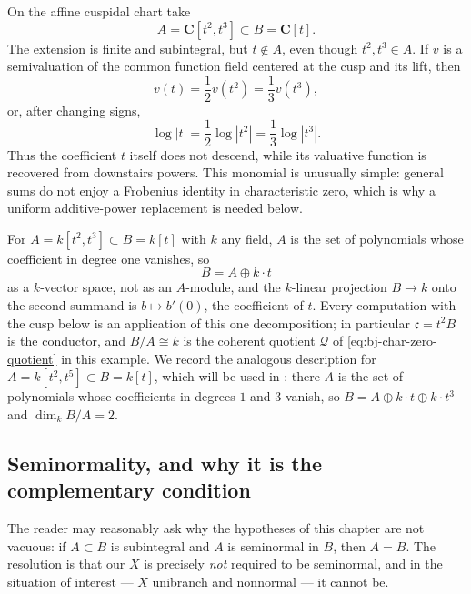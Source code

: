 \begin{example}
\label{ex:ch44-cusp-basic}
On the affine cuspidal chart take
\[
              A=\mathbf C[t^2,t^3]\subset B=\mathbf C[t].
\]
The extension is finite and subintegral, but $t\notin A$, even though
$t^2,t^3\in A$.  If $v$ is a semivaluation of the common function field
centered at the cusp and its lift, then
\[
       v(t)=\frac12v(t^2)=\frac13v(t^3),
\]
or, after changing signs,
\[
       \log|t|=\frac12\log|t^2|
              =\frac13\log|t^3|.
\]
Thus the coefficient $t$ itself does not descend, while its valuative
function is recovered from downstairs powers.  This monomial is unusually
simple: general sums do not enjoy a Frobenius identity in characteristic
zero, which is why a uniform additive-power replacement is needed below.
\end{example}

\begin{remark}
\label{rem:ch44-cusp-decomposition}
For $A=k[t^2,t^3]\subset B=k[t]$ with $k$ any field, $A$ is the set of
polynomials whose coefficient in degree one vanishes, so
\[
 B=A\oplus k\cdot t
\]
as a $k$-vector space, not as an $A$-module, and the $k$-linear
projection $B\to k$ onto the second summand is
$b\mapsto b'(0)$, the coefficient of $t$.  Every computation with the
cusp below is an application of this one decomposition; in particular
$\mathfrak c=t^2B$ is the conductor, and $B/A\cong k$ is the coherent
quotient $\mathcal Q$ of
\eqref{eq:bj-char-zero-quotient} in this example.  We record the analogous
description for $A=k[t^2,t^5]\subset B=k[t]$, which will be used in
: there $A$ is the set of polynomials whose
coefficients in degrees $1$ and $3$ vanish, so
$B=A\oplus k\cdot t\oplus k\cdot t^3$ and $\dim_kB/A=2$.
\end{remark}

\subsection{Seminormality, and why it is the complementary condition}
\label{sec:ch44-seminormality}

The reader may reasonably ask why the hypotheses of this chapter are not
vacuous: if $A\subset B$ is subintegral and $A$ is seminormal in $B$,
then $A=B$.  The resolution is that our $X$ is precisely \emph{not}
required to be seminormal, and in the situation of interest --- $X$
unibranch and nonnormal --- it cannot be.

